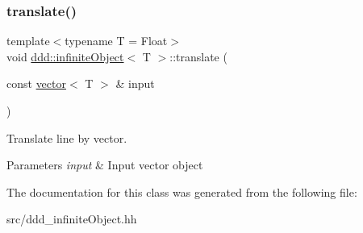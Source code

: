 \subsubsection{\texorpdfstring{translate()}{translate()}}
{\footnotesize\ttfamily template$<$typename T = Float$>$ \\
void \hyperlink{classddd_1_1infinite_object}{ddd\+::infinite\+Object}$<$ T $>$\+::translate (\begin{DoxyParamCaption}\item[{const \hyperlink{classddd_1_1vector}{vector}$<$ T $>$ \&}]{input }\end{DoxyParamCaption})\hspace{0.3cm}{\ttfamily [inline]}}



Translate line by vector. 


\begin{DoxyParams}{Parameters}
{\em input} & Input vector object \\
\hline
\end{DoxyParams}


The documentation for this class was generated from the following file\+:\begin{DoxyCompactItemize}
\item 
src/ddd\+\_\+infinite\+Object.\+hh\end{DoxyCompactItemize}
